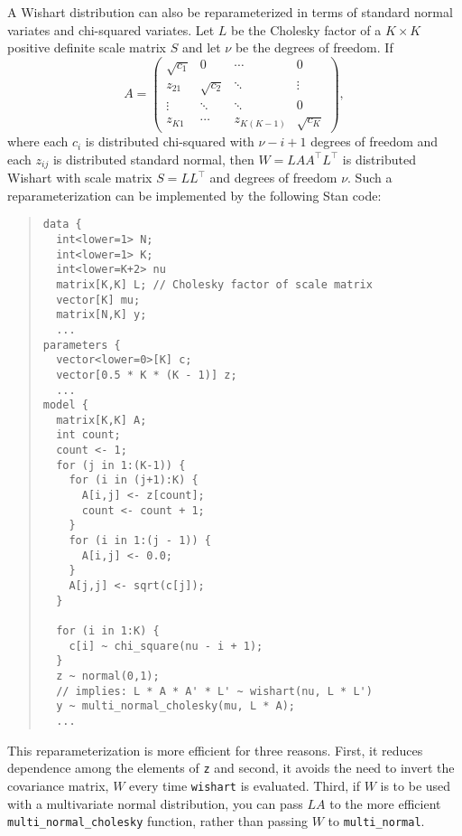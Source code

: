 A Wishart distribution can also be reparameterized in terms of standard
normal variates and chi-squared variates. Let $L$ be the Cholesky factor
of a $K \times K$ positive definite scale matrix $S$ and let $\nu$ be
the degrees of freedom. If
%
\begin{equation*}
A = \left( \begin{array}{cccc}
\sqrt{c_{1}} & 0 & \cdots & 0\\
z_{21} & \sqrt{c_{2}} & \ddots & \vdots\\
\vdots & \ddots & \ddots & 0\\
z_{K1} & \cdots & z_{K\left(K-1\right)} & \sqrt{c_{K}}
 \end{array} \right),
\end{equation*}
%
where each $c_i$ is distributed chi-squared with $\nu - i + 1$ degrees
of freedom and each $z_{ij}$ is distributed standard normal, then
$W = LAA^{\top}L^{\top}$ is distributed Wishart with scale matrix
$S = LL^{\top}$ and degrees of freedom $\nu$. Such a reparameterization
can be implemented by the following Stan code:
%
\begin{quote}
\begin{Verbatim}[fontsize=\small]
data {
  int<lower=1> N;
  int<lower=1> K;
  int<lower=K+2> nu
  matrix[K,K] L; // Cholesky factor of scale matrix
  vector[K] mu;
  matrix[N,K] y;
  ...
parameters {
  vector<lower=0>[K] c;
  vector[0.5 * K * (K - 1)] z;
  ...
model {
  matrix[K,K] A;
  int count;
  count <- 1;
  for (j in 1:(K-1)) {
    for (i in (j+1):K) {
      A[i,j] <- z[count];
      count <- count + 1;
    }
    for (i in 1:(j - 1)) {
      A[i,j] <- 0.0;
    }
    A[j,j] <- sqrt(c[j]);
  }
  
  for (i in 1:K) {
    c[i] ~ chi_square(nu - i + 1);
  }
  z ~ normal(0,1);
  // implies: L * A * A' * L' ~ wishart(nu, L * L')
  y ~ multi_normal_cholesky(mu, L * A);
  ...
\end{Verbatim}
\end{quote}
%
This reparameterization is more efficient for three reasons. First, it
reduces dependence among the elements of \Verb|z| and second, it
avoids the need to invert the covariance matrix, $W$ every time 
\Verb|wishart| is evaluated. Third, if $W$ is to be used with a
multivariate normal distribution, you can pass $L A$ to the more
efficient \Verb|multi_normal_cholesky| function, rather than passing
$W$ to \Verb|multi_normal|.

